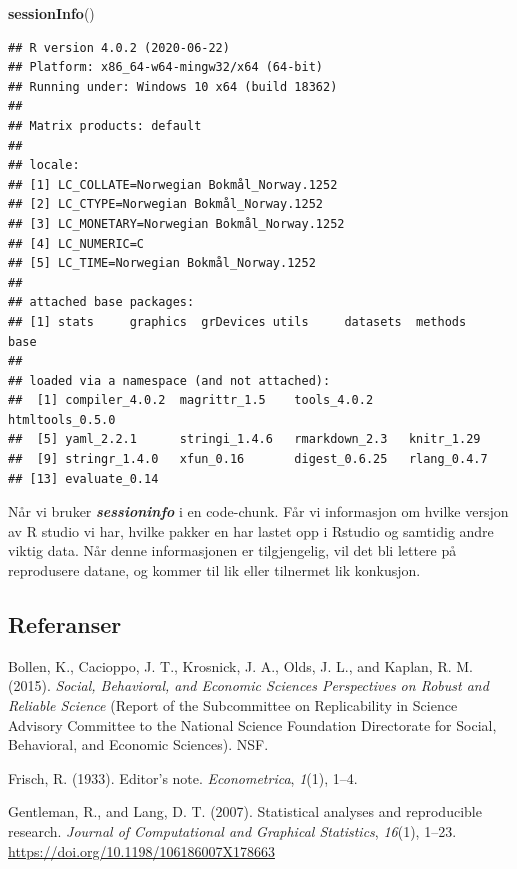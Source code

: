\documentclass[
  12pt,
]{article}
\newenvironment{Shaded}{\begin{snugshade}}{\end{snugshade}}
\newcommand{\KeywordTok}[1]{\textcolor[rgb]{0.13,0.29,0.53}{\textbf{#1}}}
\newcommand{\NormalTok}[1]{#1}
\begin{document}
\begin{Shaded}
\begin{Highlighting}[]
\KeywordTok{sessionInfo}\NormalTok{()}
\end{Highlighting}
\end{Shaded}

\begin{verbatim}
## R version 4.0.2 (2020-06-22)
## Platform: x86_64-w64-mingw32/x64 (64-bit)
## Running under: Windows 10 x64 (build 18362)
## 
## Matrix products: default
## 
## locale:
## [1] LC_COLLATE=Norwegian Bokmål_Norway.1252 
## [2] LC_CTYPE=Norwegian Bokmål_Norway.1252   
## [3] LC_MONETARY=Norwegian Bokmål_Norway.1252
## [4] LC_NUMERIC=C                            
## [5] LC_TIME=Norwegian Bokmål_Norway.1252    
## 
## attached base packages:
## [1] stats     graphics  grDevices utils     datasets  methods   base     
## 
## loaded via a namespace (and not attached):
##  [1] compiler_4.0.2  magrittr_1.5    tools_4.0.2     htmltools_0.5.0
##  [5] yaml_2.2.1      stringi_1.4.6   rmarkdown_2.3   knitr_1.29     
##  [9] stringr_1.4.0   xfun_0.16       digest_0.6.25   rlang_0.4.7    
## [13] evaluate_0.14
\end{verbatim}

Når vi bruker \textbf{\emph{sessioninfo}} i en code-chunk. Får vi
informasjon om hvilke versjon av R studio vi har, hvilke pakker en har
lastet opp i Rstudio og samtidig andre viktig data. Når denne
informasjonen er tilgjengelig, vil det bli lettere på reprodusere
datane, og kommer til lik eller tilnermet lik konkusjon.

\hypertarget{referanser}{%
\subsection{Referanser}\label{referanser}}

\hypertarget{refs}{}
\leavevmode\hypertarget{ref-bollen2015}{}%
Bollen, K., Cacioppo, J. T., Krosnick, J. A., Olds, J. L., and Kaplan,
R. M. (2015). \emph{Social, Behavioral, and Economic Sciences
Perspectives on Robust and Reliable Science} (Report of the Subcommittee
on Replicability in Science Advisory Committee to the National Science
Foundation Directorate for Social, Behavioral, and Economic Sciences).
NSF.

\leavevmode\hypertarget{ref-frisch1933}{}%
Frisch, R. (1933). Editor's note. \emph{Econometrica}, \emph{1}(1),
1--4.

\leavevmode\hypertarget{ref-gentleman2007}{}%
Gentleman, R., and Lang, D. T. (2007). Statistical analyses and
reproducible research. \emph{Journal of Computational and Graphical
Statistics}, \emph{16}(1), 1--23.
\url{https://doi.org/10.1198/106186007X178663}
\end{document}
